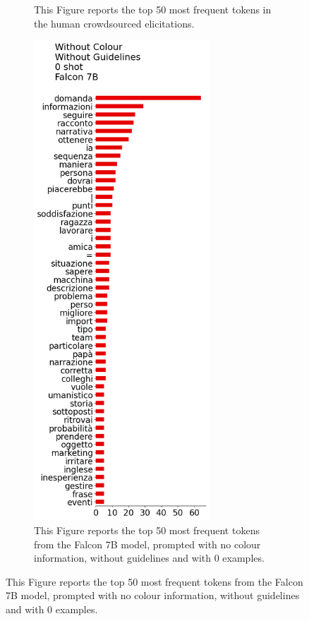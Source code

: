 \begin{figure}[!htbp]
\begin{subfigure}[t]{0.25\textwidth}
        \caption{This Figure reports the top 50 most frequent tokens in the human crowdsourced elicitations.}
        \label{sub:persona-narrative-elicitation-comparison-distribution-human}
    \end{subfigure}
    \hspace{-1.5cm}
    \begin{subfigure}[t]{0.45\textwidth}
        \centering
        \includegraphics[height=18cm]{assets/imgs/tokens-vertical/no_color/no_guidelines/0_shot/token_distribution_no_color_no_guidelines_0_shot_falcon-7b.png}
        \caption{This Figure reports the top 50 most frequent tokens from the Falcon 7B model, prompted with no colour information, without guidelines and with 0 examples.}

\end{subfigure}
\end{figure}
